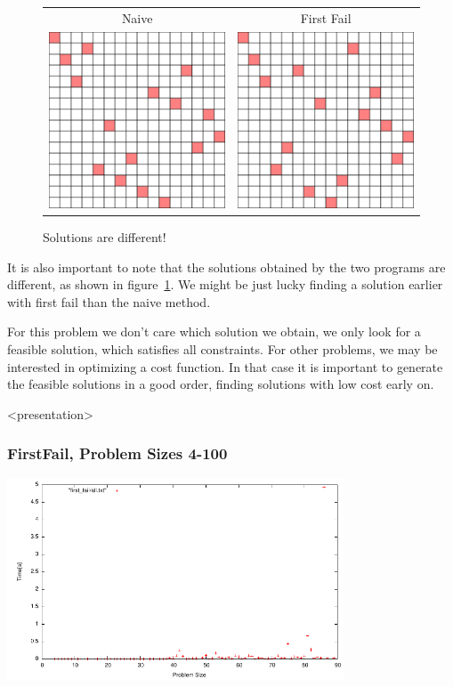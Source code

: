 \begin{figure}[h]
\caption{\label{nqueen:different solutions}Solutions are different!}
\begin{center}
\begin{tabular}{cc}
Naive & First Fail \\
\includegraphics[width=6cm]{../nqueen/naive/frame2959}
&
\includegraphics[width=6cm]{../nqueen/first_fail/frame24}
\end{tabular}
\end{center}
\end{figure}

It is also important to note that the solutions obtained by the two programs are different, as shown in figure~\ref{nqueen:different solutions}. We might be just lucky finding a solution earlier with first fail than the naive method.

For this problem we don't care which solution we obtain, we only look for a feasible solution, which satisfies all constraints. For other problems, we may be interested in optimizing a cost function. In that case it is important to generate the feasible solutions in a good order, finding solutions with low cost early on.

\begin{frame}<presentation>
\frametitle{FirstFail, Problem Sizes 4-100}
\includegraphics[width=10cm]{../nqueen/first_fail/all}
\end{frame}

